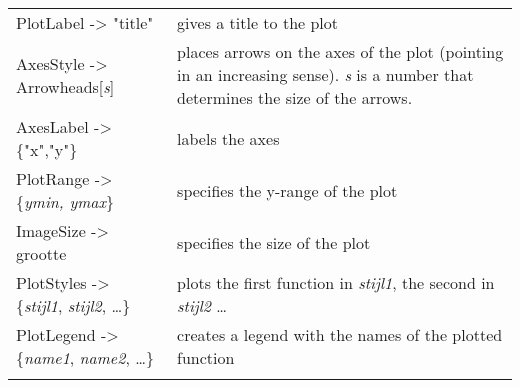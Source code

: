 \begin{tabular}{>{\hfill}p{6.5cm}p{11cm}}
	PlotLabel  -> "title" 					&	gives a title to the plot\\
	AxesStyle -> Arrowheads[\textit{s}]			&	places arrows on the axes of the plot (pointing in an increasing sense). \textit{s} is a number that determines the size of the arrows.\\ 
	AxesLabel -> \{"x","y"\}				&	labels the axes\\
	PlotRange -> \{\textit{ymin, ymax}\}			&	specifies the y-range of the plot\\
	ImageSize -> grootte				&	specifies the size of the plot\\
	PlotStyles -> \{\textit{stijl1}, \textit{stijl2}, \ldots\}			&	plots the first function in \textit{stijl1}, the second in \textit{stijl2} \ldots\\
	PlotLegend -> \{\textit{name1},  \textit{name2}, \ldots\}	&	creates a legend with the names of the plotted function\\
	\multicolumn{2}{l}{} 
\end{tabular}


